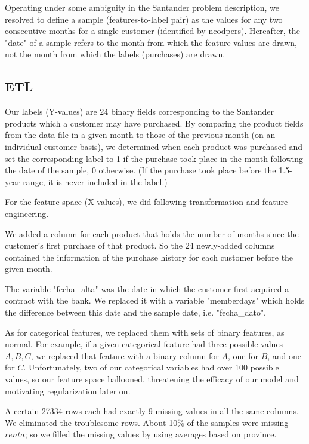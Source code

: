 \documentclass{article}
\begin{document}
\begin{spacing}{1}
\begin{large}
Operating under some ambiguity in the Santander problem description, we resolved to define a sample (features-to-label pair) as the values for any two consecutive months for a single customer (identified by ncodpers). Hereafter, the "date" of a sample refers to the month from which the feature values are drawn, not the month from which the labels (purchases) are drawn.

\subsection{ETL}

Our labels (Y-values) are 24 binary fields corresponding to the Santander products which a customer may have purchased. By comparing the product fields from the data file in a given month to those of the previous month (on an individual-customer basis), we determined when each product was purchased and set the corresponding label to 1 if the purchase took place in the month following the date of the sample, 0 otherwise. (If the purchase took place before the 1.5-year range, it is never included in the label.)

For the feature space (X-values), we did following transformation and feature engineering.

We added a column for each product that holds the number of months since the customer’s first purchase of that product. So the 24 newly-added columns contained the information of the purchase history for each customer before the given month.

The variable "fecha\_alta" was the date in which the customer first acquired a contract with the bank. We replaced it with a variable "memberdays" which holds the difference between this date and the sample date, i.e. "fecha\_dato".

As for categorical features, we replaced them with sets of binary features, as normal. For example, if a given categorical feature had three possible values ${A,B,C}$, we replaced that feature with a binary column for $A$, one for $B$, and one for $C$. Unfortunately, two of our categorical variables had over 100 possible values, so our feature space ballooned, threatening the efficacy of our model and motivating regularization later on.

A certain 27334 rows each had exactly 9 missing values in all the same columns. We eliminated the troublesome rows. About 10\% of the samples were missing $renta$; so we filled the missing values by using averages based on province.


\end{large}
\end{spacing}
\end{document}
